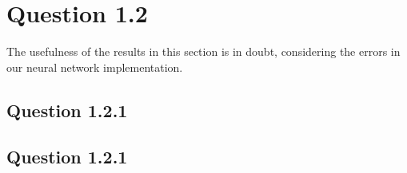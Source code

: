 \section*{Question 1.2}

The usefulness of the results in this section is in doubt, considering
the errors in our neural network implementation.

\subsection*{Question 1.2.1}

	

\subsection*{Question 1.2.1}
	
	

